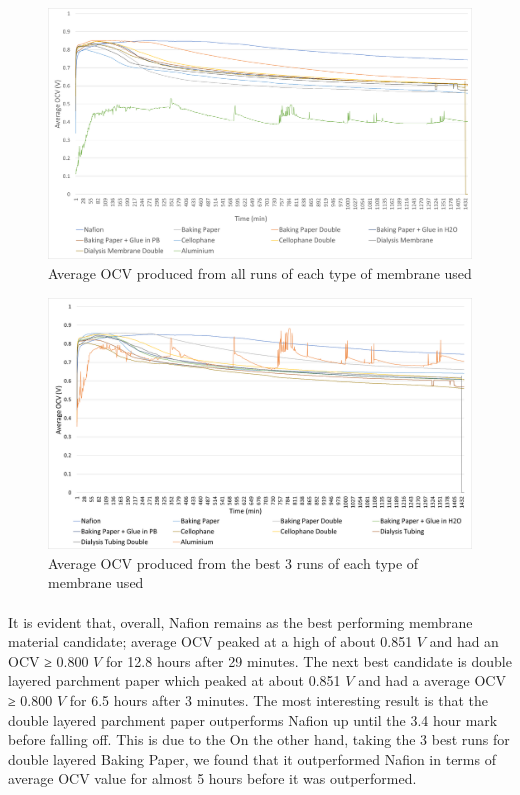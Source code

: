\documentclass[12pt, twocolumn, a4paper]{article}
\begin{document}
    \begin{figure}
        \centering
        \includegraphics[scale = 0.2]{Averages.png}
        \caption{Average OCV produced from all runs of each type of membrane used}
        \label{fig:averages}
    \end{figure}
    \begin{figure}
        \centering
        \includegraphics[scale=0.2]{best3.png}
        \caption{Average OCV produced from the best 3 runs of each type of membrane used}
        \label{fig:averages}
    \end{figure}
    
    \paragraph{}It is evident that, overall, Nafion\texttrademark{} remains as the best performing membrane material candidate; average OCV peaked at a high of about 0.851 $V$ and had an OCV ≥ 0.800 $V$ for 12.8 hours after 29 minutes. The next best candidate is double layered parchment paper which peaked at about 0.851 $V$ and had a average OCV ≥ 0.800 $V$ for 6.5 hours after 3 minutes. The most interesting result is that the double layered parchment paper outperforms Nafion\texttrademark{} up until the 3.4 hour mark before falling off. This is due to the On the other hand, taking the 3 best runs for double layered Baking Paper, we found that it outperformed Nafion\texttrademark{} in terms of average OCV value for almost 5 hours before it was outperformed. 
    
\end{document}
